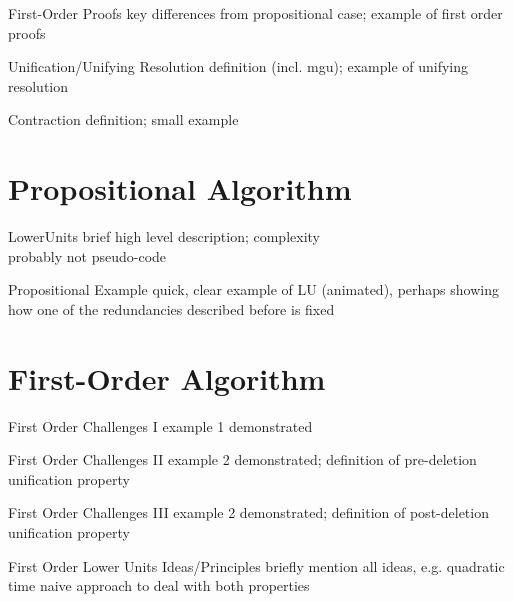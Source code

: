 \documentclass{beamer}
\begin{document}
\begin{frame}{First-Order Proofs}
key differences from propositional case; example of first order proofs
\end{frame}

\begin{frame}{Unification/Unifying Resolution}
definition (incl. mgu); example of unifying resolution
\end{frame}

\begin{frame}{Contraction}
definition; small example
\end{frame}

\section{Propositional Algorithm}

\begin{frame}{LowerUnits}
brief high level description; complexity\\
probably not pseudo-code
\end{frame}

\begin{frame}{Propositional Example}
quick, clear example of LU (animated), perhaps showing how one of the redundancies described before is fixed
\end{frame}

\section{First-Order Algorithm}

\begin{frame}{First Order Challenges I}
example 1 demonstrated
\end{frame}

\begin{frame}{First Order Challenges II}
example 2 demonstrated; definition of pre-deletion unification property
\end{frame}

\begin{frame}{First Order Challenges III}
example 2 demonstrated; definition of post-deletion unification property
\end{frame}

\begin{frame}{First Order Lower Units Ideas/Principles}
briefly mention all ideas, e.g. quadratic time naive approach to deal with both properties
\end{frame}
\end{document}
